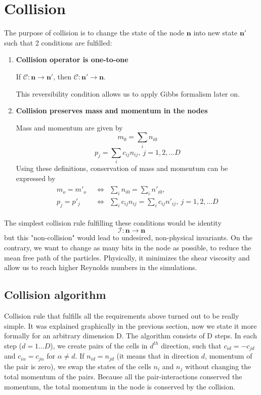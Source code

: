 \section{Collision}

The purpose of collision is to change the state of the node $\bm{n}$ into new state $\bm{n'}$ such that 2 conditions are fulfilled:

\begin{enumerate}
\item \textbf{Collision operator is one-to-one}

If $\mathcal{C}: \bm{n} \rightarrow \bm{n'}$,
then $\mathcal{C}: \bm{n'} \rightarrow \bm{n}$.

This reversibility condition allows us to apply Gibbs formalism later on.

\item \textbf{Collision preserves mass and momentum in the nodes}

Mass and momentum are given by
\begin{equation}
m_0 = \sum_i n_{i0}
\end{equation}
\begin{equation}
p_j = \sum_i c_{ij} n_{ij},~j=1,2,...D
\end{equation}
Using these definitions, conservation of mass and momentum can be expressed by
\begin{align}\label{mmc}
\begin{split} 
m_o = m'_o &~~ \Leftrightarrow ~~ \sum_i n_{i0} = \sum_i n'_{i0}, \\
p_j = p'_j &~~ \Leftrightarrow ~~ \sum_i c_{ij} n_{ij} = \sum_i c_{ij} n'_{ij}, ~j=1,2,... D 
\end{split}
\end{align}
\end{enumerate}
The simplest collision rule fulfilling these conditions would be identity
\begin{equation}
\mathcal{I}:\bm{n} \rightarrow \bm{n}
\end{equation}
but this "non-collision" would lead to undesired, non-physical invariants.
On the contrary, we want to change as many bits in the node as possible, to reduce the mean free path of the particles. Physically, it minimizes the shear viscosity and allow us to reach higher Reynolds numbers in the simulations.

\subsection{Collision algorithm}
Collision rule that fulfills all the requirements above turned out to be really simple. It was explained graphically in the previous section, now we state it more formally for an arbitrary dimension D.
The algorithm consists of D steps.
In each step ($d=1...D$), we create pairs of the cells in $d^{th}$ direction, such that $c_{id} = -c_{jd}$ and $c_{i\alpha} = c_{j\alpha}$ for $\alpha \neq d$.
If $n_{id} = n_{jd}$ (it means that in direction $d$, momentum of the pair is zero), we swap the states of the cells $n_i$ and $n_j$ without changing the total momentum of the pairs.
Because all the pair-interactions conserved the momentum, the total momentum in the node is conserved by the collision.

